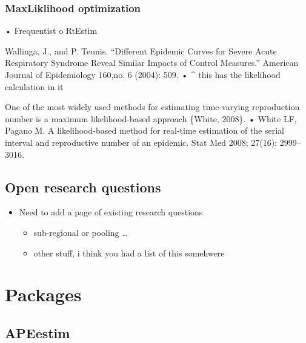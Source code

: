 \documentclass[
  letterpaper,
  DIV=11,
  numbers=noendperiod]{scrreprt}
\providecommand{\tightlist}{%
  \setlength{\itemsep}{0pt}\setlength{\parskip}{0pt}}\usepackage{longtable,booktabs,array}
\begin{document}
\section*{MaxLiklihood optimization}\label{maxliklihood-optimization}


• Frequentist o RtEstim

Wallinga, J., and P. Teunis. ``Different Epidemic Curves for Severe
Acute Respiratory Syndrome Reveal Similar Impacts of Control Measures.''
American Journal of Epidemiology 160,no. 6 (2004): 509. • \^{} this has
the likelihood calculation in it

One of the most widely used methods for estimating time-varying
reproduction number is a maximum likelihood-based approach \{White,
2008\}. • White LF, Pagano M. A likelihood-based method for real-time
estimation of the serial interval and reproductive number of an
epidemic. Stat Med 2008; 27(16): 2999--3016.

\chapter*{Open research questions}\label{open-research-questions}


\begin{itemize}
\tightlist
\item
  Need to add a page of existing research questions

  \begin{itemize}
  \tightlist
  \item
    sub-regional or pooling \ldots{}
  \item
    other stuff, i think you had a list of this somehwere
  \end{itemize}
\end{itemize}

\part{Packages}

\chapter*{APEestim}\label{apeestim}
\end{document}
